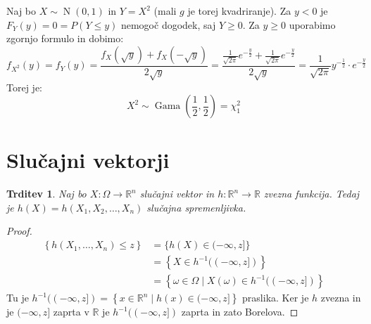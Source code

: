 \documentclass[12pt]{book}
\theoremstyle{definition}
\theoremstyle{plain}
\theoremstyle{plain}
\newtheorem{trditev}{Trditev}
\theoremstyle{plain}
\theoremstyle{remark}
\begin{document}
\begin{zgled}
    Naj bo $X \sim \operatorname{N}(0, 1)$ in $Y = X^2$ (mali $g$ je torej kvadriranje). Za $y<0$ je $F_Y(y)=0=P(Y \leq y)$ nemogoč dogodek, saj $Y \geq 0$. Za $y \geq 0$ uporabimo zgornjo formulo in dobimo: 
    $$
    f_{X^2}(y) = f_Y(y) = \frac{f_X(\sqrt{y})+f_X(-\sqrt{y})}{2 \sqrt{y}} =\frac{\frac{1}{\sqrt{2 \pi}}e^{-\frac{y}{2}} + \frac{1}{\sqrt{2 \pi}}e^{-\frac{y}{2}}}{2 \sqrt{y}} =\frac{1}{\sqrt{2 \pi}} y^{-\frac{1}{2}} \cdot e^{-\frac{y}{2}}
    $$
    Torej je: 
    $$
    X^2 \sim \operatorname{Gama}\left(\frac{1}{2}, \frac{1}{2}\right)=\chi_1^2 
    $$
\end{zgled}

\section{Slučajni vektorji}

\begin{trditev}
    Naj bo $X: \Omega \rightarrow \mathbb{R}^n$ slučajni vektor in $h: \mathbb{R}^n \rightarrow \mathbb{R}$ zvezna funkcija. Tedaj je $h(X)=h\left(X_1, X_2, \ldots, X_n\right)$ slučajna spremenljivka.
\end{trditev}

\begin{proof}
    $$
    \begin{aligned}
        \left\{h\left(X_1, \ldots, X_n\right) \leq z\right\}&=\{h(X) \in(-\infty, z]\} \\
        &= \left\{X \in h^{-1}((-\infty, z])\right\} \\
        &= \left\{\omega \in \Omega \mid X(\omega) \in h^{-1}((-\infty, z])\right\}
    \end{aligned}
    $$
    Tu je $h^{-1}((-\infty, z])=\left\{x\in \mathbb{R}^n \mid h(x) \in(-\infty, z]\right\}$ praslika. Ker je $h$ zvezna in je $(-\infty, z]$ zaprta v $\mathbb{R}$ je $h^{-1}((-\infty, z])$ zaprta in zato Borelova.
\end{proof}
\end{document}
